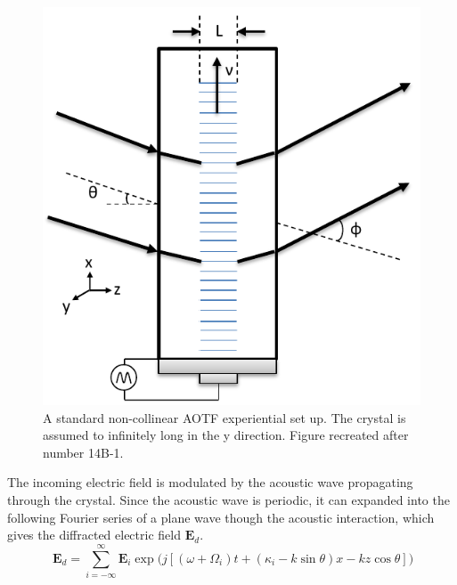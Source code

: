 \begin{figure}
    \begin{center}
    \includegraphics{./Images/3-1-AOTFExperimentSetUp.pdf}
    \caption[AOTF Experimental Set Up]{A standard non-collinear AOTF experiential set up. The crystal is assumed to infinitely long in the y direction. Figure recreated after \cite{Guenther1990} number 14B-1.}
    \label{fig:3.1:AOTFExperimentalSetUp}
    \end{center}
\end{figure}

The incoming electric field is modulated by the acoustic wave propagating through the crystal. Since the acoustic wave is periodic, it can expanded into the following Fourier series of a plane wave though the acoustic interaction, which gives the diffracted electric field $\mathbf{E}_{d}$.
\begin{equation}
    \ \mathbf{E}_{d} = \sum_{i=-\infty}^{\infty}\mathbf{E}_{i}\exp{(j[(\omega+\Omega_{i})t+(\kappa_{i}-k\sin\theta)x-kz\cos\theta]})
    \label{eqn:3.1:modulatedEField}
\end{equation}

